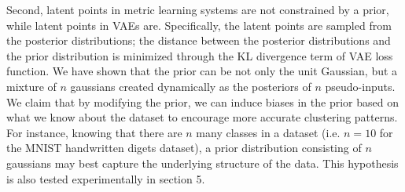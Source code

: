     Second, latent points in metric learning systems are not constrained by a prior, while latent points in VAEs are. Specifically, the latent points are sampled from the posterior distributions; the distance between the posterior distributions and the prior distribution is minimized through the KL divergence term of VAE loss function. We have shown that the prior can be not only the unit Gaussian, but a mixture of $n$ gaussians created dynamically as the posteriors of $n$ pseudo-inputs. We claim that by modifying the prior, we can induce biases in the prior based on what we know about the dataset to encourage more accurate clustering patterns. For instance, knowing that there are $n$ many classes in a dataset (i.e. $n=10$ for the MNIST handwritten digets dataset), a prior distribution consisting of $n$ gaussians may best capture the underlying structure of the data. This hypothesis is also tested experimentally in section 5.